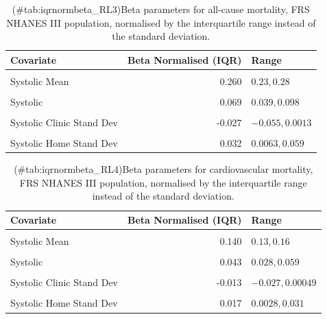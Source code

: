 \documentclass[
]{article}
\begin{document}
\begin{table}[!h]
\centering
\caption{(\#tab:iqrnormbeta_RL3)Beta parameters for all-cause mortality, FRS NHANES III population, normalised by the interquartile range instead of the standard deviation.}
\centering
\begin{tabular}[t]{lrl}
\toprule
Covariate & Beta Normalised (IQR) & Range\\
\midrule
\cellcolor{gray!10}{Diastolic Mean} & \cellcolor{gray!10}{-0.022} & \cellcolor{gray!10}{\(-0.05,0.0065\)}\\
Systolic Mean & 0.260 & \(0.23,0.28\)\\
\cellcolor{gray!10}{Diastolic} & \cellcolor{gray!10}{0.060} & \cellcolor{gray!10}{\(0.023,0.096\)}\\
Systolic & 0.069 & \(0.039,0.098\)\\
\cellcolor{gray!10}{Diastolic Clinic Stand Dev} & \cellcolor{gray!10}{0.003} & \cellcolor{gray!10}{\(-0.037,0.043\)}\\
Systolic Clinic Stand Dev & -0.027 & \(-0.055,0.0013\)\\
\cellcolor{gray!10}{Diastolic Home Stand Dev} & \cellcolor{gray!10}{0.021} & \cellcolor{gray!10}{\(-0.01,0.052\)}\\
Systolic Home Stand Dev & 0.032 & \(0.0063,0.059\)\\
\bottomrule
\end{tabular}
\end{table}

\begin{table}[!h]
\centering
\caption{(\#tab:iqrnormbeta_RL4)Beta parameters for cardiovascular mortality, FRS NHANES III population, normalised by the interquartile range instead of the standard deviation.}
\centering
\begin{tabular}[t]{lrl}
\toprule
Covariate & Beta Normalised (IQR) & Range\\
\midrule
\cellcolor{gray!10}{Diastolic Mean} & \cellcolor{gray!10}{-0.019} & \cellcolor{gray!10}{\(-0.034,-0.0036\)}\\
Systolic Mean & 0.140 & \(0.13,0.16\)\\
\cellcolor{gray!10}{Diastolic} & \cellcolor{gray!10}{0.054} & \cellcolor{gray!10}{\(0.035,0.072\)}\\
Systolic & 0.043 & \(0.028,0.059\)\\
\cellcolor{gray!10}{Diastolic Clinic Stand Dev} & \cellcolor{gray!10}{0.007} & \cellcolor{gray!10}{\(-0.012,0.026\)}\\
Systolic Clinic Stand Dev & -0.013 & \(-0.027,0.00049\)\\
\cellcolor{gray!10}{Diastolic Home Stand Dev} & \cellcolor{gray!10}{0.005} & \cellcolor{gray!10}{\(-0.011,0.021\)}\\
Systolic Home Stand Dev & 0.017 & \(0.0028,0.031\)\\
\bottomrule
\end{tabular}
\end{table}
\end{document}
